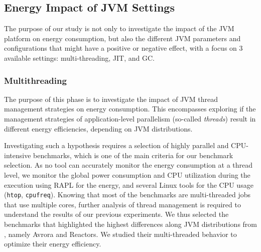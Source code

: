 \subsection{Energy Impact of JVM Settings}
The purpose of our study is not only to investigate the impact of the JVM platform on energy consumption, but also the different JVM parameters and configurations that might have a positive or negative effect, with a focus on 3 available settings: multi-threading, JIT, and GC.

\subsubsection{Multithreading}
The purpose of this phase is to investigate the impact of JVM thread management strategies on energy consumption.
This encompasses exploring if the management strategies of application-level parallelism (so-called \emph{threads}) result in different energy efficiencies, depending on JVM distributions.

Investigating such a hypothesis requires a selection of highly parallel and CPU-intensive benchmarks, which is one of the main criteria for our benchmark selection.
As no tool can accurately monitor the energy consumption at a thread level, we monitor the global power consumption and CPU utilization during the execution using RAPL for the energy, and several Linux tools for the CPU usage (\texttt{htop}, \texttt{cpufreq}).
Knowing that most of the benchmarks are multi-threaded jobs that use multiple cores, further analysis of thread management is required to understand the results of our previous experiments.
We thus selected the benchmarks that highlighted the highest differences along JVM distributions from , namely \textsf{Avrora} and \textsf{Reactors}.
We studied their multi-threaded behavior to optimize their energy efficiency.

